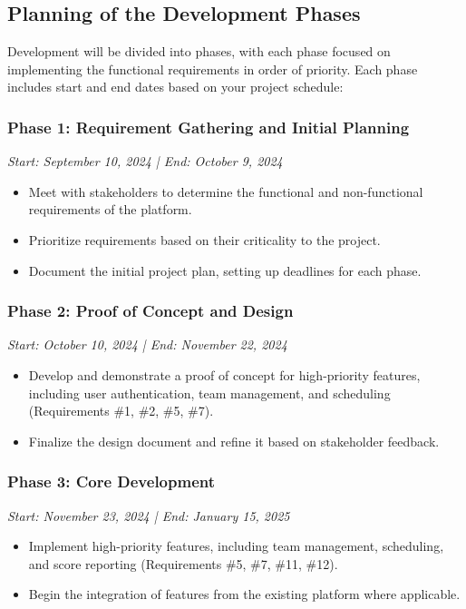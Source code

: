 \documentclass[12pt, titlepage]{article}
\begin{document}
\subsection{Planning of the Development Phases}
Development will be divided into phases, with each phase focused on implementing the functional requirements in order of priority. Each phase includes start and end dates based on your project schedule:

\subsubsection{Phase 1: Requirement Gathering and Initial Planning}
\textit{Start: September 10, 2024 | End: October 9, 2024}
\begin{itemize}
    \item Meet with stakeholders to determine the functional and non-functional requirements of the platform.
    \item Prioritize requirements based on their criticality to the project.
    \item Document the initial project plan, setting up deadlines for each phase.
\end{itemize}

\subsubsection{Phase 2: Proof of Concept and Design}
\textit{Start: October 10, 2024 | End: November 22, 2024}
\begin{itemize}
    \item Develop and demonstrate a proof of concept for high-priority features, including user authentication, team management, and scheduling (Requirements \#1, \#2, \#5, \#7).
    \item Finalize the design document and refine it based on stakeholder feedback.
\end{itemize}

\subsubsection{Phase 3: Core Development}
\textit{Start: November 23, 2024 | End: January 15, 2025}
\begin{itemize}
    \item Implement high-priority features, including team management, scheduling, and score reporting (Requirements \#5, \#7, \#11, \#12).
    \item Begin the integration of features from the existing platform where applicable.
\end{itemize}
\end{document}

